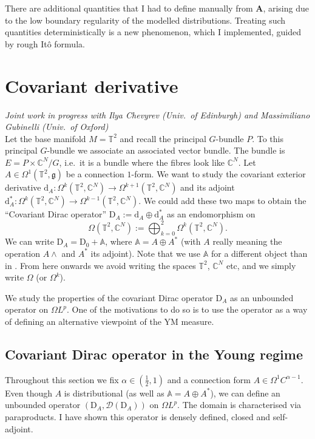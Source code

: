\documentclass[12pt]{article}
\numberwithin{equation}{section}
\theoremstyle{definition}
\theoremstyle{remark}
\newcommand{\diff}{\mathrm{d}}
\newcommand{\1}{\mathbf 1}
\newcommand{\<}{\langle}
\renewcommand{\>}{\rangle}
\newcommand{\bfA}{\mathbf A}
\newcommand{\bA}{\mathbb A}
\newcommand{\cD}{\mathcal D}
\newcommand{\rmD}{\mathrm{D}}
\newcommand{\fg}{\mathfrak g}
\newcommand{\bC}{\mathbb C}
\newcommand{\bT}{\mathbb T}
\begin{document}
There are additional quantities that I had to define manually from $\bfA$, arising due to the low boundary regularity of the modelled distributions. Treating such quantities deterministically is a new phenomenon, which I implemented, guided by rough It\^o formula.


\section{Covariant derivative}\label{sec:operator}
\vspace{-7pt}\textit{{\footnotesize Joint work in progress with Ilya Chevyrev (Univ.\ of Edinburgh) and Massimiliano Gubinelli (Univ.\ of Oxford)}}\\

\noindent \vspace{-2pt}Let the base manifold $M=\bT^2$ and recall the principal $G$-bundle $P$.    To this principal $G$-bundle we associate an associated vector bundle. The bundle is $E=P\times \bC^N/G$, i.e.\ it is a bundle where the fibres look like $\bC^N$. %
Let $A\in\Omega^1(\bT^2,\fg)$ be a connection $1$-form. We want to study the covariant exterior derivative $\diff_A:\Omega^k(\bT^2,\bC^N)\to \Omega^{k+1}(\bT^2,\bC^N)$ and its adjoint $\diff^*_A:\Omega^k(\bT^2,\bC^N)\to \Omega^{k-1}(\bT^2,\bC^N)$. We could add these two maps to obtain the ``Covariant Dirac operator'' $\rmD_A:= \diff_A\oplus\diff_A^*$ as an endomorphism on 
\[
\Omega(\bT^2,\bC^N):=\bigoplus_{k=0}^2 \Omega^k(\bT^2,\bC^N).
\]
We can write $\rmD_A=\rmD_0+\bA$, where $\bA=A\oplus A^*$ (with $A$ really meaning the operation $A\wedge$ and $A^*$ its adjoint). Note that we use $\bA$ for a different object than in . 
From here onwards we avoid writing the spaces $\bT^2$, $\bC^N$ etc, and we simply write $\Omega$ (or $\Omega^k$). 

We study the properties of the covariant Dirac operator $\rmD_A$ as an unbounded operator on $\Omega L^p$. One of the motivations to do so is to use the operator as a way of defining an alternative viewpoint of the YM measure. 


\subsection{Covariant Dirac operator in the Young regime}
Throughout this section we fix $\alpha\in (\frac 1 2,1)$ and a connection form $A\in\Omega^1 C^{\alpha-1}$. Even though $A$ is distributional (as well as $\bA=A\oplus A^*$), we can define an unbounded operator $(\rmD_A,\cD(\rmD_A))$ on $\Omega L^p$. The domain is characterised via paraproducts. I have shown this operator is densely defined, closed and self-adjoint. 
\end{document}
